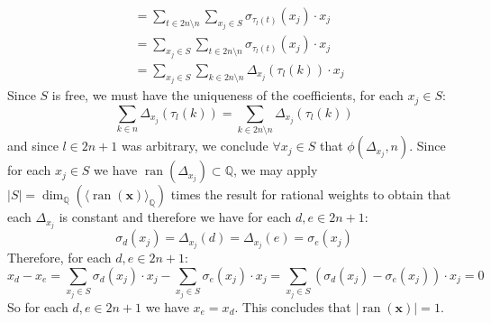 \begin{solution}
\begin{align*}
        &= \sum_{t \in 2n \setminus n} \sum_{x_j \in S} \sigma_{\tau_{l}(t)}(x_j) \cdot x_j \\
        &= \sum_{x_j \in S} \sum_{t \in 2n \setminus n} \sigma_{\tau_{l}(t)}(x_j) \cdot x_j \\
        &= \sum_{x_j \in S} \sum_{k \in 2n \setminus n} \Delta_{x_{j}}(\tau_{l}(k)) \cdot x_j
    \end{align*}
    Since \( S \) is free, we must have the uniqueness of the coefficients, for each \( x_j \in S \):
    \[
        \sum_{k \in n} \Delta_{x_{j}}\left(\tau_{l}\left(k\right)\right) = \sum_{k \in 2n \setminus n} \Delta_{x_{j}}\left(\tau_{l}\left(k\right)\right)
    \]
    and since \( l \in 2n + 1 \) was arbitrary, we conclude \( \forall x_j \in S \) that \( \phi\left(\Delta_{x_{j}}, n\right) \). Since for each \( x_j \in S \) we have \( \operatorname{ran}\left(\Delta_{x_{j}}\right) \subset \mathbb{Q} \), we may apply \( |S| = \dim_{\mathbb{Q}}\left(\langle \operatorname{ran}\left(\textbf{x}\right) \rangle_{\mathbb{Q}}\right) \) times the result for rational weights to obtain that each \( \Delta_{x_{j}} \) is constant and therefore we have for each \( d, e \in 2n + 1 \):
    \[
        \sigma_d\left(x_j\right) = \Delta_{x_{j}}\left(d\right) = \Delta_{x_{j}}\left(e\right) = \sigma_e\left(x_j\right)
    \]
    Therefore, for each \( d, e \in 2n + 1 \):
    \[
        x_d - x_e = \sum_{x_j \in S} \sigma_{d}\left(x_j\right) \cdot x_j - \sum_{x_j \in S} \sigma_{e}\left(x_j\right) \cdot x_j = \sum_{x_j \in S} \left(\sigma_{d}\left(x_j\right) - \sigma_{e}\left(x_j\right)\right) \cdot x_j = 0
    \]
    So for each \( d, e \in 2n + 1 \) we have \( x_e = x_d \). This concludes that \( |\operatorname{ran}\left(\textbf{x}\right)| = 1 \).
\end{solution}
